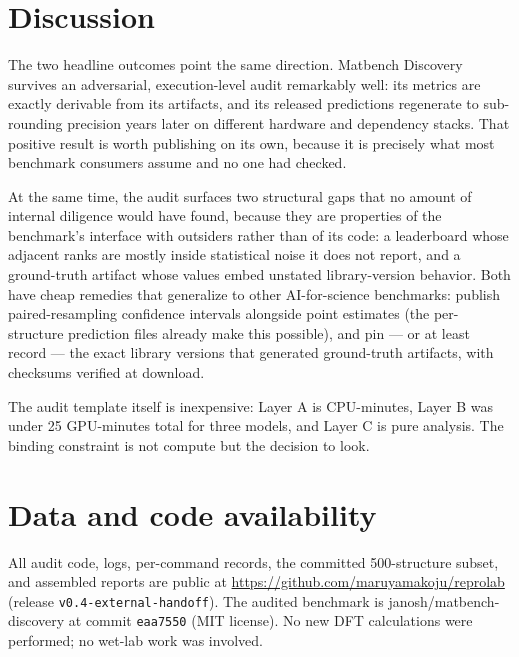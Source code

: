 \documentclass[11pt]{article}
\newcommand{\code}[1]{\texttt{#1}}
\begin{document}
\section{Discussion}

The two headline outcomes point the same direction. Matbench Discovery
survives an adversarial, execution-level audit remarkably well: its metrics
are exactly derivable from its artifacts, and its released predictions
regenerate to sub-rounding precision years later on different hardware and
dependency stacks. That positive result is worth publishing on its own,
because it is precisely what most benchmark consumers assume and no one had
checked.

At the same time, the audit surfaces two structural gaps that no amount of
internal diligence would have found, because they are properties of the
benchmark's interface with outsiders rather than of its code: a leaderboard
whose adjacent ranks are mostly inside statistical noise it does not report,
and a ground-truth artifact whose values embed unstated library-version
behavior. Both have cheap remedies that generalize to other AI-for-science
benchmarks: publish paired-resampling confidence intervals alongside point
estimates (the per-structure prediction files already make this possible),
and pin --- or at least record --- the exact library versions that generated
ground-truth artifacts, with checksums verified at download.

The audit template itself is inexpensive: Layer A is CPU-minutes, Layer B was
under 25 GPU-minutes total for three models, and Layer C is pure analysis.
The binding constraint is not compute but the decision to look.

\section*{Data and code availability}

All audit code, logs, per-command records, the committed 500-structure subset,
and assembled reports are public at
\url{https://github.com/maruyamakoju/reprolab} (release
\code{v0.4-external-handoff}). The audited benchmark is
janosh/matbench-discovery at commit \code{eaa7550} (MIT license). No new
DFT calculations were performed; no wet-lab work was involved.
\end{document}
